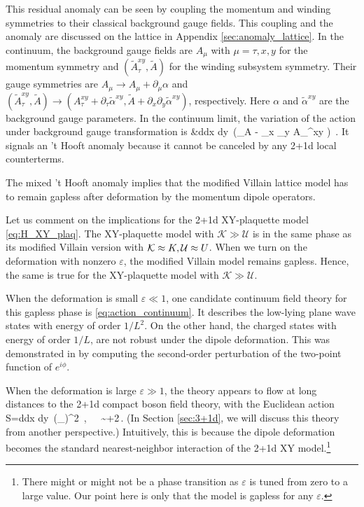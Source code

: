 \documentclass[12pt]{article}
\numberwithin{equation}{section}
\def\d{\partial}
\begin{document}
This residual anomaly can be seen by coupling the momentum and winding symmetries to their classical background gauge fields.  This coupling and the anomaly are discussed on the lattice in Appendix \ref{sec:anomaly_lattice}.  In the continuum, the background gauge fields are $A_\mu$ with $\mu=\tau,x,y$ for the momentum symmetry and $(\tilde A^{xy}_\tau, \tilde A)$  for the winding subsystem symmetry.  Their gauge symmetries are $A_{\mu}\rightarrow A_\mu+\d_\mu \alpha$ and $(\tilde A^{xy}_{\tau},\tilde A)\rightarrow (A^{xy}_{\tau}+\d_\tau\tilde\alpha^{xy},\tilde A+\d_x\d_y\tilde\alpha^{xy})$, respectively. Here $\alpha$ and $\tilde\alpha^{xy}$ are the background gauge parameters.  In the continuum limit, the variation of the action under background gauge transformation is
\ie\label{XYplaq-deform-anomaly-lattice-continuum}
&\int d\tau dx dy\, \alpha(\d_\tau \tilde A - \d_x \d_y \tilde A_\tau^{xy} )~.
\fe
It signals an 't Hooft anomaly because it cannot be canceled by any 2+1d local counterterms.




The mixed 't Hooft anomaly  implies that the modified Villain lattice model has to remain gapless after deformation by the momentum dipole operators.


Let us comment on the implications for the 2+1d XY-plaquette model \eqref{eq:H_XY_plaq}.
The  XY-plaquette model with  $\mathcal K\gg \mathcal U$ is in the same phase as its modified Villain version with ${\cal K}\approx K,{\cal U}\approx U$.
When we turn on the deformation with nonzero $\varepsilon$, the modified Villain model remains gapless.  Hence, the same is true for the XY-plaquette model with $\mathcal K\gg \mathcal U$.








When the deformation is small $\varepsilon \ll 1$, one candidate  continuum field theory for this gapless phase is  \eqref{eq:action_continuum}.
It describes   the  low-lying plane wave states with energy of order $1/L^2$.  On the other hand,
the charged states with energy of order $1/L$,  are not robust under the dipole deformation.
This was demonstrated in \cite{PhysRevB.66.054526} by computing the second-order perturbation of the two-point function of $e^{i\phi}$.


When the deformation is large $\varepsilon\gg 1$, the theory appears to flow at long distances to the 2+1d compact boson  field theory, with the Euclidean action
\ie\label{2dcontt}
S=\int d\tau dx dy\, (\d_\mu\phi)^2~,~~~\phi\sim \phi+2\pi\,.
\fe
(In Section \ref{sec:3+1d}, we will discuss this theory from another perspective.) Intuitively, this is because the dipole deformation becomes the standard nearest-neighbor interaction of the 2+1d XY model.\footnote{There might or might not be a phase transition as $\varepsilon$ is tuned from zero to a large value.  Our point here is only that the model is gapless for any $\varepsilon$.}
\end{document}
